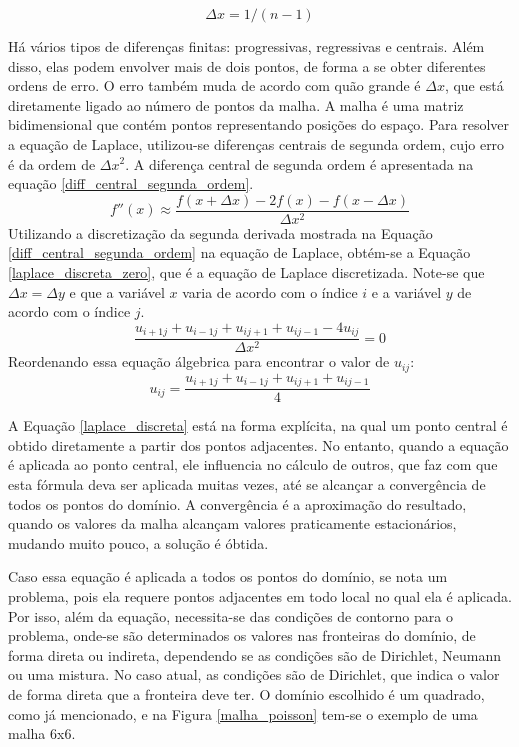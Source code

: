 \documentclass[journal]{IEEEtran}
\begin{document}
\begin{equation}
\Delta x = 1/(n-1)\label{delta_x}
\end{equation}


Há vários tipos de diferenças finitas: progressivas, regressivas e centrais. Além disso, elas podem envolver mais de dois pontos, de forma a se obter diferentes ordens de erro. O erro também muda de acordo com quão grande é $\Delta x$, que está diretamente ligado ao número de pontos da malha. A malha é uma matriz bidimensional que contém pontos representando posições do espaço. Para resolver a equação de Laplace, utilizou-se diferenças centrais de segunda ordem, cujo erro é da ordem de $\Delta x^2$. A diferença central de segunda ordem é apresentada na equação \ref{diff_central_segunda_ordem}.
\begin{equation}
f''(x)\approx \frac{f(x+\Delta x)-2f(x)-f(x-\Delta x)}{\Delta x^2}\label{diff_central_segunda_ordem}
\end{equation}
Utilizando a discretização da segunda derivada mostrada na Equação \ref{diff_central_segunda_ordem} na equação de Laplace, obtém-se a Equação \ref{laplace_discreta_zero}, que é a equação de Laplace discretizada. Note-se que $\Delta x=\Delta y$ e que a variável $x$ varia de acordo com o índice $i$ e a variável $y$ de acordo com o índice $j$.
\begin{equation}
\frac{u_{i+1j}+u_{i-1j}+u_{ij+1}+u_{ij-1}-4u_{ij}}{\Delta x^2}=0 \label{laplace_discreta_zero}
\end{equation}
Reordenando essa equação álgebrica para encontrar o valor de $u_{ij}$:
\begin{equation}
  u_{ij}=\frac{u_{i+1j}+u_{i-1j}+u_{ij+1}+u_{ij-1}}{4} \label{laplace_discreta}
\end{equation}

A Equação \ref{laplace_discreta} está na forma explícita, na qual um ponto central é obtido diretamente a partir dos pontos adjacentes. No entanto, quando a equação é aplicada ao ponto central, ele influencia no cálculo de outros, que faz com que esta fórmula deva ser aplicada muitas vezes, até se alcançar a convergência de todos os pontos do domínio. A convergência é a aproximação do resultado, quando os valores da malha alcançam valores praticamente estacionários, mudando muito pouco, a solução é óbtida.

Caso essa equação é aplicada a todos os pontos do domínio, se nota um problema, pois ela requere pontos adjacentes em todo local no qual ela é aplicada. Por isso, além da equação, necessita-se das condições de contorno para o problema, onde-se são determinados os valores nas fronteiras do domínio, de forma direta ou indireta, dependendo se as condições são de Dirichlet, Neumann ou uma mistura. No caso atual, as condições são de Dirichlet, que indica o valor de forma direta que a fronteira deve ter. O domínio escolhido é um quadrado, como já mencionado, e na Figura \ref{malha_poisson} tem-se o exemplo de uma malha 6x6.
\end{document}
